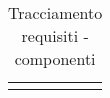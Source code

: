 \begin{center}
\begin{longtable}{|c|p{0.25\linewidth}|p{0.5\linewidth}|}
\bottomrule
\caption{Tracciamento requisiti - componenti}
\end{longtable}
\end{center} 
